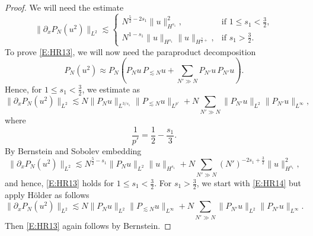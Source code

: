 \documentclass[12pt,letterpaper]{amsart}
\theoremstyle{remark}
\numberwithin{equation}{section}
\numberwithin{theorem}{section}
\numberwithin{table}{section}
\begin{document}
\begin{proof}
We will need the estimate
\begin{equation}
\label{E:HR13}
\|\partial_x P_N(u^2) \|_{L^2} \lesssim 
\begin{cases}
N^{\frac52-2s_1} \| u \|_{H^{s_1}}^2,  & \text{if }1\leq s_1 < \frac32, \\
N^{1-s_1} \| u \|_{H^{s_1}} \| u \|_{H^{\frac32+}},& \text{if } s_1 > \frac32.
\end{cases}
\end{equation}
To prove \eqref{E:HR13}, we will now need the paraproduct decomposition
\begin{equation}
\label{E:HR14}
P_N( u^2 ) \approx P_N( P_N u \,  P_{\lesssim N} u + \sum_{N' \gg N} P_{N'} u \, P_{N'}u).
\end{equation}
Hence, for $1\leq s_1 < \frac32$, we estimate as
$$
\|\partial_x P_N(u^2) \|_{L^2} \lesssim N \|P_N u \|_{L^{3/s_1}} \| P_{\lesssim N} u \|_{L^{p'}} +  N \sum_{N' \gg N} \| P_{N'} u \|_{L^2} \| P_{N'}u \|_{L^\infty},
$$
where 
$$\frac{1}{p'} = \frac12 - \frac{s_1}{3}.$$
By Bernstein and Sobolev embedding
$$
\|\partial_x P_N(u^2) \|_{L^2} \lesssim N^{\frac52-s_1} \|P_N u \|_{L^2} \| u \|_{H^{s_1}} +  N \sum_{N' \gg N} (N')^{-2s_1+\frac32}\| u \|_{H^{s_1}}^2,
$$
and hence, \eqref{E:HR13} holds for $1\leq s_1 < \frac32$.  For $s_1>\frac32$, we start with \eqref{E:HR14} but apply H\"older as follows
$$
\|\partial_x P_N(u^2) \|_{L^2} \lesssim N \| P_N u \|_{L^2} \|P_{\lesssim N} u \|_{L^\infty} + N \sum_{N' \gg N} \| P_{N'} u \|_{L^2} \| P_{N'}u \|_{L^\infty}.
$$
Then \eqref{E:HR13} again follows by Bernstein.


\end{proof}
\end{document}
